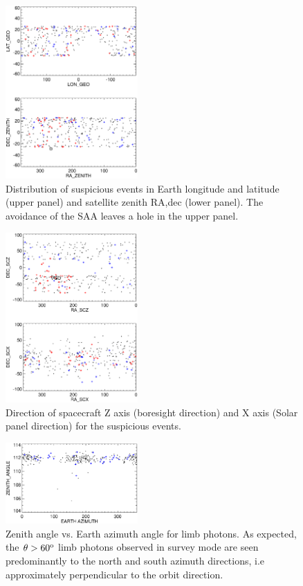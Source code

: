 \documentclass[aps,twocolumn,prd,superscriptaddress,showpacs,nofootinbib,fixfloat]{revtex4}
\newcommand{\degree}{^{\rm o}}
\begin{document}
\begin{figure}[p]
\centering
\includegraphics[width=0.45\textwidth]{plots/geo-lonlat.ps}
\caption{Distribution of suspicious events in Earth longitude and latitude
(upper panel) and satellite zenith RA,dec (lower panel).   The
avoidance of the SAA leaves a hole in the upper panel.}
\label{fig:geo-lonlat}
\end{figure}

\begin{figure}[p]
\centering
\includegraphics[width=0.45\textwidth]{plots/spacecraft-zx.ps}
\caption{Direction of spacecraft Z axis (boresight direction) and X axis
(Solar panel direction) for the suspicious events.
}
\label{fig:spacecraft-zx}
\end{figure}

\begin{figure}[p]
\centering
\includegraphics[width=0.45\textwidth]{plots/earth-az.ps}
\caption{Zenith angle vs. Earth azimuth angle for limb photons.  As expected,
  the $\theta > 60\degree$ limb photons observed in survey mode are seen
  predominantly to the north and south azimuth directions, i.e approximately
  perpendicular to the orbit direction.  }
\label{fig:earth-az}
\end{figure}
\end{document}
